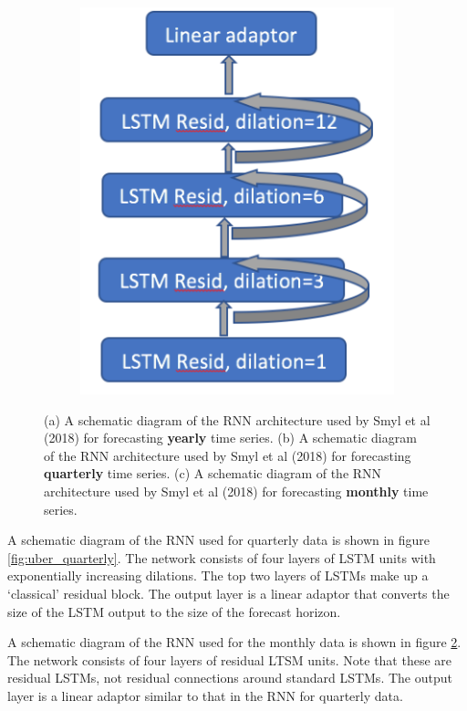 \documentclass[a4paper,12pt]{article}
\theoremstyle{definition}
\begin{document}
\begin{figure}[ht]
\begin{subfigure}[b]{0.32\textwidth}
		\includegraphics[width=\textwidth]{figures/uber_monthly.png}
		\caption{}
		\label{fig:uber_monthly}
	\end{subfigure}
	\caption{(a) A schematic diagram of the RNN architecture used by Smyl et al (2018) for forecasting \textbf{yearly} time series. (b) A schematic diagram of the RNN architecture used by Smyl et al (2018) for forecasting \textbf{quarterly} time series. (c) A schematic diagram of the RNN architecture used by Smyl et al (2018) for forecasting \textbf{monthly} time series.}
\end{figure}

A schematic diagram of the RNN used for quarterly data is shown in figure \ref{fig:uber_quarterly}. The network consists of four layers of LSTM units with exponentially increasing dilations. The top two layers of  LSTMs make up a `classical' residual block. The output layer is a linear adaptor that converts the size of the LSTM output to the size of the forecast horizon.

A schematic diagram of the RNN used for the monthly data is shown in figure \ref{fig:uber_monthly}. The network consists of four layers of residual LTSM units. Note that these are residual LSTMs, not residual connections around standard LSTMs. The output layer is a linear adaptor similar to that in the RNN for quarterly data.
\end{document}
